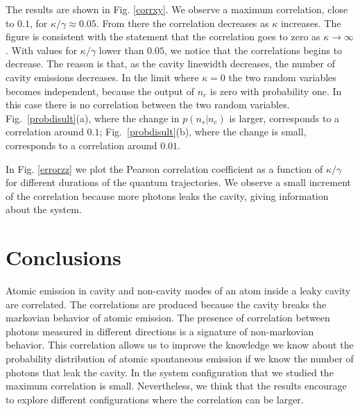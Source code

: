 \documentclass[%
 reprint,
 amsmath,amssymb,
 aps, 
]{revtex4-1}
\begin{document}

The results are shown in Fig. \ref{corrxy}. We observe a maximum
correlation, close to $0.1$, for $\kappa/\gamma\approx 0.05$. From
there the correlation decreases as $\kappa$ increases. The figure is
consistent with the statement that the correlation goes to zero as
$\kappa\rightarrow\infty$. With values for $\kappa/\gamma$ lower than
$0.05$, we notice that the correlations begins to decrease. The reason
is that, as the cavity linewidth decreases, the number of cavity
emissions decreases. In the limit where $\kappa=0$ the two random
variables becomes independent, because the output of $n_c$ is zero
with probability one. In this case there is no correlation between the
two random variables. Fig.~\ref{probdisult}(a), where the change in
$p(n_s|n_c)$ is larger, corresponds to a correlation around $0.1$;
Fig.~\ref{probdisult}(b), where the change is small, corresponds to a
correlation around $0.01$.


In Fig. \ref{errorzz} we plot the Pearson correlation coefficient as a
function of $\kappa/\gamma$ for different durations of the quantum
trajectories. We observe a small increment of the correlation
because more photons leaks the cavity, giving information about the
system.


\section{Conclusions}\label{sc:conclusions}
Atomic emission in cavity and non-cavity modes of an atom inside a
leaky cavity are correlated. The correlations are produced because the
cavity breaks the markovian behavior of atomic emission. The presence
of correlation between photons measured in different directions is a
signature of non-markovian behavior. This correlation allows us to
improve the knowledge we know about the probability distribution of
atomic spontaneous emission if we know the number of photons that leak
the cavity. In the system configuration that we studied the maximum
correlation is small. Nevertheless, we think that the results
encourage to explore different configurations where the correlation
can be larger.
\end{document}
